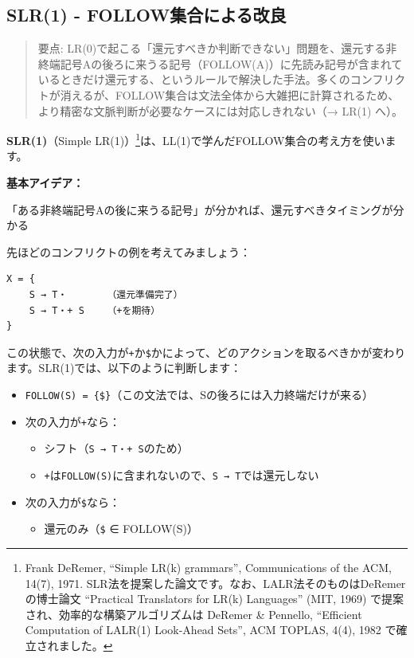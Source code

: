 \hypertarget{chapter5-slr1---followux96c6ux5408ux306bux3088ux308bux6539ux826f}{%
\subsection{SLR(1) -
FOLLOW集合による改良}\label{chapter5-slr1---followux96c6ux5408ux306bux3088ux308bux6539ux826f}}

\begin{quote}
要点:
LR(0)で起こる「還元すべきか判断できない」問題を、還元する非終端記号Aの後ろに来うる記号（FOLLOW(A)）に先読み記号が含まれているときだけ還元する、というルールで解決した手法。多くのコンフリクトが消えるが、FOLLOW集合は文法全体から大雑把に計算されるため、より精密な文脈判断が必要なケースには対応しきれない（→
LR(1) へ）。
\end{quote}

\textbf{SLR(1)}（Simple
LR(1)）\footnote{Frank DeRemer, ``Simple LR(k) grammars'',
  Communications of the ACM, 14(7), 1971.
  SLR法を提案した論文です。なお、LALR法そのものはDeRemerの博士論文
  ``Practical Translators for LR(k) Languages'' (MIT, 1969)
  で提案され、効率的な構築アルゴリズムは DeRemer \& Pennello,
  ``Efficient Computation of LALR(1) Look-Ahead Sets'', ACM TOPLAS,
  4(4), 1982 で確立されました。}は、LL(1)で学んだFOLLOW集合の考え方を使います。

\textbf{基本アイデア：}

「ある非終端記号Aの後に来うる記号」が分かれば、還元すべきタイミングが分かる

先ほどのコンフリクトの例を考えてみましょう：

\begin{verbatim}
X = {
    S → T・       （還元準備完了）
    S → T・+ S    （+を期待）
}
\end{verbatim}

この状態で、次の入力が\texttt{+}か\texttt{\$}かによって、どのアクションを取るべきかが変わります。SLR(1)では、以下のように判断します：

\begin{itemize}
\tightlist
\item
  \texttt{FOLLOW(S)\ =\ \{\$\}}（この文法では、Sの後ろには入力終端だけが来る）
\item
  次の入力が\texttt{+}なら：

  \begin{itemize}
  \tightlist
  \item
    シフト（\texttt{S\ →\ T・+\ S}のため）
  \item
    \texttt{+}は\texttt{FOLLOW(S)}に含まれないので、\texttt{S\ →\ T}では還元しない
  \end{itemize}
\item
  次の入力が\texttt{\$}なら：

  \begin{itemize}
  \tightlist
  \item
    還元のみ（\texttt{\$} ∈ FOLLOW(S)）
  \end{itemize}
\end{itemize}

